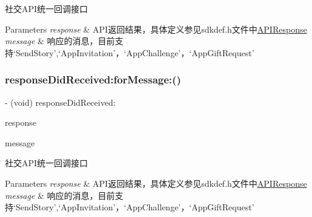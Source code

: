 社交\+A\+P\+I统一回调接口 
\begin{DoxyParams}{Parameters}
{\em response} & A\+P\+I返回结果，具体定义参见sdkdef.\+h文件中\mbox{\hyperlink{interface_a_p_i_response}{A\+P\+I\+Response}} \\
\hline
{\em message} & 响应的消息，目前支持‘\+Send\+Story’,‘\+App\+Invitation’，‘\+App\+Challenge’，‘\+App\+Gift\+Request’ \\
\hline
\end{DoxyParams}
\mbox{\label{protocol_tencent_session_delegate-p_aec2b0e15cdc45c30b0f67b708f97c44a}} 
\subsubsection{\texorpdfstring{response\+Did\+Received\+:for\+Message\+:()}{responseDidReceived:forMessage:()}\hspace{0.1cm}{\footnotesize\ttfamily [2/2]}}
{\footnotesize\ttfamily -\/ (void) response\+Did\+Received\+: \begin{DoxyParamCaption}\item[{(\mbox{\hyperlink{interface_a_p_i_response}{A\+P\+I\+Response}} $\ast$)}]{response }\item[{forMessage:(N\+S\+String $\ast$)}]{message }\end{DoxyParamCaption}\hspace{0.3cm}{\ttfamily [optional]}}

社交\+A\+P\+I统一回调接口 
\begin{DoxyParams}{Parameters}
{\em response} & A\+P\+I返回结果，具体定义参见sdkdef.\+h文件中\mbox{\hyperlink{interface_a_p_i_response}{A\+P\+I\+Response}} \\
\hline
{\em message} & 响应的消息，目前支持‘\+Send\+Story’,‘\+App\+Invitation’，‘\+App\+Challenge’，‘\+App\+Gift\+Request’ \\
\hline
\end{DoxyParams}
\mbox{\label{protocol_tencent_session_delegate-p_ac6628547be6fc0208797fbd6a5d7830c}} 
